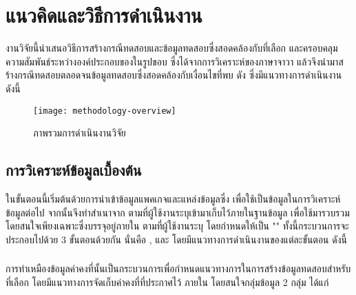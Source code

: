 \section{แนวคิดและวิธีการดำเนินงาน}
\label{sec:methodology}

งานวิจัยนี้นำเสนอวิธีการสร้างกรณีทดสอบและข้อมูลทดสอบซึ่งสอดคล้องกับ{\TestPath}ที่เลือก 
และครอบคลุมความสัมพันธ์ระหว่างองค์ประกอบของ{\software}ในรูปขอบ{\scg} 
ซึ่งได้จากการวิเคราะห์{\StaticInformation}ของ{\sourcecode}ภาษาจาวา แล้วจึงนำมาสร้างกรณีทดสอบตลอดจนข้อมูลทดสอบซึ่งสอดคล้องกับเงื่อนไขที่พบ
ดัง ซึ่งมีแนวทางการดำเนินงานดังนี้

\begin{centering}
    \begin{figure}[ht!]
        \centering
        \texttt{[image: methodology-overview]}
        \caption{ภาพรวมการดำเนินงานวิจัย}
        \label{fig:methodologyoverview}
    \end{figure}
\end{centering}

\subsection{การวิเคราะห์ข้อมูลเบื้องต้น}
\label{subs:introsection}

ในขั้นตอนนี้เริ่มต้นด้วยการนำเข้าข้อมูลแพคเกจและแหล่งข้อมูล{\sourcecode}ซึ่ง{\tester} เพื่อใช้เป็นข้อมูลในการวิเคราะห์ข้อมูล{\sourcecode}ต่อไป
จากนั้นจึงทำสำเนา{\sourcecode}จาก{\Repository} ตามที่ผู้ใช้งานระบุเข้ามาเก็บไว้ภายในฐานข้อมูล  เพื่อใช้มารวบรวม{\StaticInformation} 
โดยสนใจเพียงเฉพาะ{\class}ซึ่งบรรจุอยู่ภายใน\FirstTimeDefine{\Package}{\PackageEN} ตามที่ผู้ใช้งานระบุ 
โดยกำหนดให้เป็น "\FirstTimeDefine{\CUT}{\CUTEN}" ทั้งนี้กระบวนการจะประกอบไปด้วย 3 ขั้นตอนด้วยกัน นั่นคือ
{\constantExtracting}, {\graphCreation} 
และ{\sourcecodeInstrumention} 
โดยมีแนวทางการดำเนินงานของแต่ละขั้นตอน ดังนี้

\subsubsection{\constantExtracting}
\label{sec:sub:sub:sourceCodeExtract}

การทำเหมืองข้อมูลค่าคงที่นั้นเป็นกระบวนการเพื่อกำหนดแนวทางการในการสร้างข้อมูลทดสอบสำหรับ{\TestPath}ที่เลือก โดยมีแนวทางการจัดเก็บค่าคงที่ที่ประกาศไว้
ภายใน{\sourcecode} โดยสนใจกลุ่มข้อมูล 2 กลุ่ม ได้แก่


